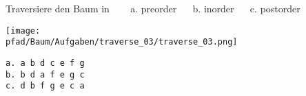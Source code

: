 \question[3]
Traversiere den Baum in ~~~
a. preorder  ~~
b. inorder  ~~
c. postorder

\texttt{[image: \\pfad/Baum/Aufgaben/traverse\_03/traverse\_03.png]}
\begin{solutionbox}{3cm}
\begin{lstlisting}
a. a b d c e f g
b. b d a f e g c
c. d b f g e c a 
\end{lstlisting}
\end{solutionbox}
